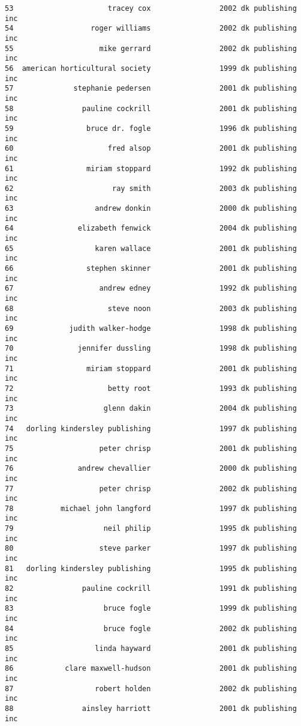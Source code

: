 \documentclass[
]{report}
\begin{document}
\begin{verbatim}
53                      tracey cox                2002 dk publishing inc
54                  roger williams                2002 dk publishing inc
55                    mike gerrard                2002 dk publishing inc
56  american horticultural society                1999 dk publishing inc
57              stephanie pedersen                2001 dk publishing inc
58                pauline cockrill                2001 dk publishing inc
59                 bruce dr. fogle                1996 dk publishing inc
60                      fred alsop                2001 dk publishing inc
61                 miriam stoppard                1992 dk publishing inc
62                       ray smith                2003 dk publishing inc
63                   andrew donkin                2000 dk publishing inc
64               elizabeth fenwick                2004 dk publishing inc
65                   karen wallace                2001 dk publishing inc
66                 stephen skinner                2001 dk publishing inc
67                    andrew edney                1992 dk publishing inc
68                      steve noon                2003 dk publishing inc
69             judith walker-hodge                1998 dk publishing inc
70               jennifer dussling                1998 dk publishing inc
71                 miriam stoppard                2001 dk publishing inc
72                      betty root                1993 dk publishing inc
73                     glenn dakin                2004 dk publishing inc
74   dorling kindersley publishing                1997 dk publishing inc
75                    peter chrisp                2001 dk publishing inc
76               andrew chevallier                2000 dk publishing inc
77                    peter chrisp                2002 dk publishing inc
78           michael john langford                1997 dk publishing inc
79                     neil philip                1995 dk publishing inc
80                    steve parker                1997 dk publishing inc
81   dorling kindersley publishing                1995 dk publishing inc
82                pauline cockrill                1991 dk publishing inc
83                     bruce fogle                1999 dk publishing inc
84                     bruce fogle                2002 dk publishing inc
85                   linda hayward                2001 dk publishing inc
86            clare maxwell-hudson                2001 dk publishing inc
87                   robert holden                2002 dk publishing inc
88                ainsley harriott                2001 dk publishing inc

\end{verbatim}
\end{document}
